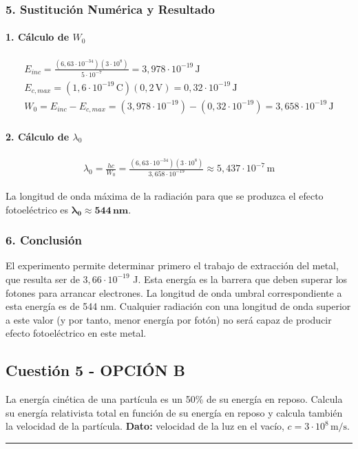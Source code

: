 \subsubsection*{5. Sustitución Numérica y Resultado}
\paragraph{1. Cálculo de $W_0$}
\begin{gather}
    E_{inc} = \frac{(6,63\cdot10^{-34})(3\cdot10^8)}{5\cdot10^{-7}} = 3,978 \cdot 10^{-19} \, \text{J} \\
    E_{c,max} = (1,6\cdot10^{-19} \, \text{C})(0,2 \, \text{V}) = 0,32 \cdot 10^{-19} \, \text{J} \\
    W_0 = E_{inc} - E_{c,max} = (3,978 \cdot 10^{-19}) - (0,32 \cdot 10^{-19}) = 3,658 \cdot 10^{-19} \, \text{J}
\end{gather}
\paragraph{2. Cálculo de $\lambda_0$}
\begin{gather}
    \lambda_0 = \frac{hc}{W_0} = \frac{(6,63\cdot10^{-34})(3\cdot10^8)}{3,658 \cdot 10^{-19}} \approx 5,437 \cdot 10^{-7} \, \text{m}
\end{gather}
\begin{cajaresultado}
La longitud de onda máxima de la radiación para que se produzca el efecto fotoeléctrico es $\boldsymbol{\lambda_0 \approx 544 \, \textbf{nm}}$.
\end{cajaresultado}

\subsubsection*{6. Conclusión}
\begin{cajaconclusion}
El experimento permite determinar primero el trabajo de extracción del metal, que resulta ser de $3,66 \cdot 10^{-19}$ J. Esta energía es la barrera que deben superar los fotones para arrancar electrones. La longitud de onda umbral correspondiente a esta energía es de 544 nm. Cualquier radiación con una longitud de onda superior a este valor (y por tanto, menor energía por fotón) no será capaz de producir efecto fotoeléctrico en este metal.
\end{cajaconclusion}

\newpage

\subsection{Cuestión 5 - OPCIÓN B}
\label{subsec:5B_2018_jun_ord}
\begin{cajaenunciado}
La energía cinética de una partícula es un 50\% de su energía en reposo. Calcula su energía relativista total en función de su energía en reposo y calcula también la velocidad de la partícula.
\textbf{Dato:} velocidad de la luz en el vacío, $c=3\cdot10^{8}\,\text{m/s}$.
\end{cajaenunciado}
\hrule

